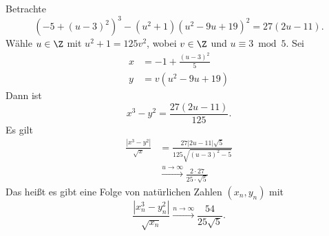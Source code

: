 Betrachte
\[ \left( -5+ (u-3)^2 \right)^3 - (u^2+1) (u^2-9u+19)^2 = 27 (2u-11). \]
Wähle $u \in \Z$ mit $u^2+1 = 125v^2$, wobei $v\in \Z$ und $u \equiv 3 \bmod 5$. Sei
\begin{align*}
	x &= -1 + \frac{(u-3)^2}{5}\\
	y &= v(u^2-9u+19)
\end{align*}
Dann ist
\[ x^3-y^2 = \frac{27(2u-11)}{125}. \]
Es gilt
\begin{align*}
	\frac{|x^3-y^2|}{\sqrt{x}} &= \frac{27 |2u-11| \sqrt{5}}{125 \sqrt{(u-3)^2-5}}\\
	&\overset{u \to \infty}{\longrightarrow} \frac{2 \cdot 27}{25 \cdot \sqrt{5}}
\end{align*}
Das heißt es gibt eine Folge von natürlichen Zahlen $(x_n,y_n)$ mit
\[ \frac{\left| x_n^3-y_n^2 \right|}{\sqrt{x_n}} \overset{n \to \infty}{\longrightarrow} \frac{54}{25 \sqrt{5}}. \]